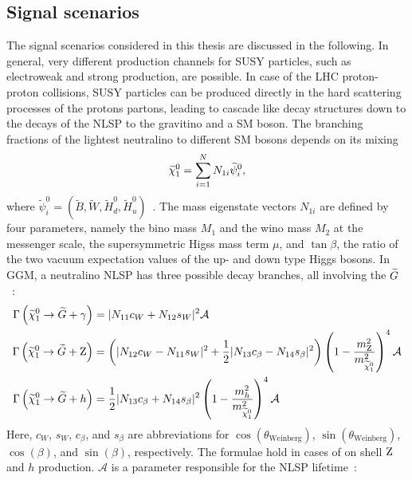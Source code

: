 \subsection{Signal scenarios}\label{sec:SMS}
The signal scenarios considered in this thesis are discussed in the following. In general, very different production channels for SUSY particles, such as electroweak and strong production, are possible. In case of the LHC proton-proton collisions, SUSY particles can be produced directly in the hard scattering processes of the protons partons, leading to cascade like decay structures down to the decays of the NLSP to the gravitino and a SM boson. The branching fractions of the lightest neutralino to different SM bosons depends on its mixing
\begin{equation}
 \widetilde{\chi}^{0}_{1} = \sum_{i=1}^{N} N_{1i} \widetilde{\psi}_i^0,
\end{equation}
where $\widetilde{\psi}_i^0=(\widetilde{B},\widetilde{W},\widetilde{H}_d^0,\widetilde{H}_u^0)$~\cite{NLSPDecay}. The mass eigenstate vectors $N_{1i}$ are defined by four parameters, namely the bino mass $M_1$ and the wino mass $M_2$ at the messenger scale, the supersymmetric Higss mass term $\mu$, and $\tan{\beta}$, the ratio of the two vacuum expectation values of the up- and down type Higgs bosons. In GGM, a neutralino NLSP has three possible decay branches, all involving the $\widetilde{G}$~\cite{NLSPDecay}:
\begin{align}
 \Gamma\left(\widetilde{\chi}^{0}_{1}\to\widetilde{G}+\gamma\right) & = |N_{11}c_W+N_{12}s_W|^2 \mathcal{A}                                                                                                                       \\
 \Gamma\left(\widetilde{\chi}^{0}_{1}\to\widetilde{G}+\mathrm{Z}\right)  & = \left(|N_{12}c_W - N_{11}s_W|^2 +\frac{1}{2}|N_{13}c_{\beta}-N_{14}s_{\beta}|^2\right)\left(1-\frac{m_{\mathrm{Z}}^2}{m_{\widetilde{\chi}^{0}_{1}}^2}\right)^4 \mathcal{A} \\
 \Gamma\left(\widetilde{\chi}^{0}_{1}\to\widetilde{G}+h\right)    & = \frac{1}{2}|N_{13}c_{\beta}+N_{14}s_{\beta}|^2\left(1-\frac{m_{h}^{2}}{m_{\widetilde{\chi}^{0}_{1}}^2}\right)^4 \mathcal{A}                                         
\end{align}
Here, $c_W$, $s_W$, $c_\beta$, and $s_\beta$ are abbreviations for $\cos(\theta_{\text{Weinberg}})$, $\sin(\theta_{\text{Weinberg}})$, $\cos(\beta)$, and $\sin(\beta)$, respectively. The formulae hold in cases of on shell $\mathrm{Z}$ and $h$ production. $\mathcal{A}$ is a parameter responsible for the NLSP lifetime~\cite{NLSP1,NLSP2}:
